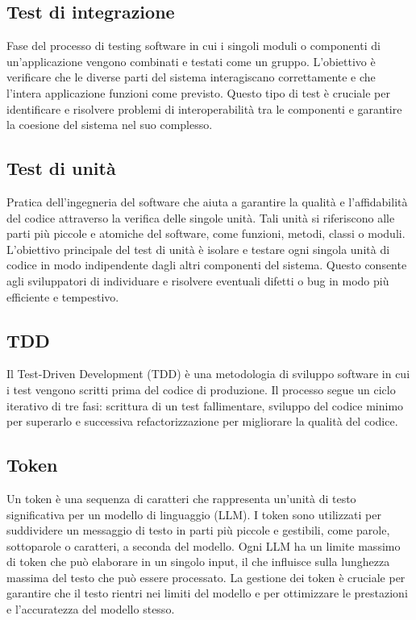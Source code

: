 \hypertarget{sec:test_integrazione}{}
\subsection*{Test di integrazione}
Fase del processo di testing software in cui i singoli moduli o componenti di un’applicazione vengono combinati e testati come un
gruppo. L’obiettivo è verificare che le diverse parti del sistema interagiscano correttamente e che l’intera applicazione funzioni
come previsto. Questo tipo di test è cruciale per identificare e risolvere problemi di interoperabilità tra le componenti e garantire
la coesione del sistema nel suo complesso.

\hypertarget{sec:test_unità}{}
\subsection*{Test di unità}
Pratica dell’ingegneria del software che aiuta a garantire la qualità e l’affidabilità del codice attraverso la verifica delle
singole unità. Tali unità si riferiscono alle parti più piccole e atomiche del software, come funzioni, metodi, classi o moduli.
L’obiettivo principale del test di unità è isolare e testare ogni singola unità di codice in modo indipendente dagli altri componenti
del sistema. Questo consente agli sviluppatori di individuare e risolvere eventuali difetti o bug in modo più efficiente e tempestivo.

\hypertarget{sec:tdd}{}
\subsection*{TDD}
Il Test-Driven Development (TDD) è una metodologia di sviluppo software in cui i test vengono scritti prima del codice di produzione. 
Il processo segue un ciclo iterativo di tre fasi: scrittura di un test fallimentare, sviluppo del codice minimo per superarlo e successiva refactorizzazione per migliorare la qualità del codice.

\hypertarget{sec:token}{}
\subsection*{Token}
Un token è una sequenza di caratteri che rappresenta un'unità di testo significativa per un modello di linguaggio (LLM). I token sono
utilizzati per suddividere un messaggio di testo in parti più piccole e gestibili, come parole, sottoparole o caratteri, a seconda del
modello. Ogni LLM ha un limite massimo di token che può elaborare in un singolo input, il che influisce sulla lunghezza massima del
testo che può essere processato. La gestione dei token è cruciale per garantire che il testo rientri nei limiti del modello e per
ottimizzare le prestazioni e l'accuratezza del modello stesso.

